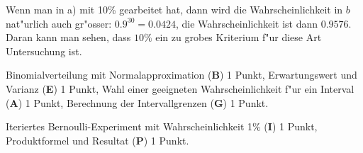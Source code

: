 \begin{loesung}
\begin{teilaufgaben}
Wenn man in a) mit 10\% gearbeitet hat, dann wird die Wahrscheinlichkeit in
$b$ nat"urlich auch gr"osser: $0.9^{30}=0.0424$, die Wahrscheinlichkeit ist
dann $0.9576$. Daran kann man sehen, dass $10\%$ ein zu grobes Kriterium
f"ur diese Art Untersuchung ist.
\end{teilaufgaben}
\end{loesung}

\begin{bewertung}
\begin{teilaufgaben}
\item Binomialverteilung mit Normalapproximation ({\bf B}) 1 Punkt,
Erwartungswert und Varianz ({\bf E}) 1 Punkt,
Wahl einer geeigneten Wahrscheinlichkeit f"ur ein Interval ({\bf A}) 1 Punkt,
Berechnung der Intervallgrenzen ({\bf G}) 1 Punkt.
\item Iteriertes Bernoulli-Experiment mit Wahrscheinlichkeit 1\% ({\bf I})
1 Punkt,
Produktformel und Resultat ({\bf P}) 1 Punkt.
\end{teilaufgaben}
\end{bewertung}


